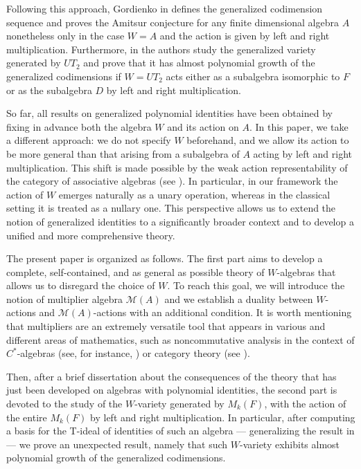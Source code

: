 \documentclass[reqno]{amsart}
\theoremstyle{definition}
\numberwithin{equation}{section}
\numberwithin{theorem}{section}
\newcommand{\M}{\mathcal{M}}
\begin{document}
Following this approach, Gordienko in \cite{Gordienko2010} defines the generalized codimension sequence and proves the Amitsur conjecture for any finite dimensional algebra $A$ nonetheless only in the case $W= A$ and the action is given by left and right multiplication. Furthermore, in \cite{MartinoRizzo2024} the authors study the generalized variety generated by $UT_2$ and prove that it has almost polynomial growth of the generalized codimensions if $W=UT_2$ acts either as a subalgebra isomorphic to $F$ or as the subalgebra $D$ by left and right multiplication.



So far, all results on generalized polynomial identities have been obtained by fixing in advance both the algebra $W$ and its action on $A$. In this paper, we take a different approach: we do not specify $W$ beforehand, and we allow its action to be more general than that arising from a subalgebra of $A$ acting by left and right multiplication. This shift is made possible by the weak action representability of the category of associative algebras (see \cite{Janelidze2022}). In particular, in our framework the action of $W$ emerges naturally as a unary operation, whereas in the classical setting it is treated as a nullary one. This perspective allows us to extend the notion of generalized identities to a significantly broader context and to develop a unified and more comprehensive theory.


The present paper is organized as follows. The first part aims to develop a complete, self-contained, and as general as possible theory of $W$-algebras that allows us to disregard the choice of $W.$ To reach this goal, we will introduce the notion of multiplier algebra $\M(A)$ and we establish a duality between $W$-actions and $\M(A)$-actions with an additional condition. It is worth mentioning that multipliers are an extremely versatile tool that appears in various and different areas of mathematics, such as noncommutative analysis in the context of $C^*$-algebras (see, for instance, \cite{DokuchaevExel2004, DokuchaevDelRioSimon2007, Exelbook}) or category theory (see \cite{BroxGarciaMancini2024, CigoliManciniMetere2023, MacLane1958}).

Then, after a brief dissertation about the consequences of the theory that has just been developed on algebras with polynomial identities, the second part is devoted to the study of the $W$-variety generated by $M_k(F)$, with the action of the entire $M_k(F)$ by left and right multiplication. In particular, after computing a basis for the T-ideal of identities of such an algebra — generalizing the result in \cite[Proposition 6.5.5]{BeidarMartindaleMikhalevm1996} — we prove an unexpected result, namely that such $W$-variety exhibits almost polynomial growth of the generalized codimensions.
\end{document}
